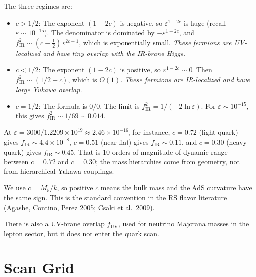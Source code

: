 \documentclass[11pt]{article}
\begin{document}
The three regimes are:
\begin{itemize}
  \item $c > 1/2$: The exponent $(1-2c)$ is negative, so
    $\varepsilon^{1-2c}$ is huge (recall $\varepsilon\sim10^{-15}$).  The
    denominator is dominated by $-\varepsilon^{1-2c}$, and
    $f_{\mathrm{IR}}^2 \sim (c-\tfrac{1}{2})\,\varepsilon^{2c-1}$, which is
    exponentially small.
    \emph{These fermions are UV-localized and have tiny overlap with the
    IR-brane Higgs.}

  \item $c < 1/2$: The exponent $(1-2c)$ is positive, so
    $\varepsilon^{1-2c}\sim 0$.  Then $f_{\mathrm{IR}}^2 \sim (1/2-c)$,
    which is $O(1)$.
    \emph{These fermions are IR-localized and have large Yukawa overlap.}

  \item $c = 1/2$: The formula is $0/0$.  The limit is
    $f_{\mathrm{IR}}^2 = 1/(-2\ln\varepsilon)$.
    For $\varepsilon\sim10^{-15}$, this gives
    $f_{\mathrm{IR}}^2 \sim 1/69 \sim 0.014$.
\end{itemize}

At $\varepsilon = 3000/1.2209\times10^{19} \approx 2.46\times10^{-16}$, for
instance, $c = 0.72$ (light quark) gives $f_{\mathrm{IR}} \sim 4.4\times10^{-8}$,
$c = 0.51$ (near flat) gives $f_{\mathrm{IR}} \sim 0.11$, and $c = 0.30$
(heavy quark) gives $f_{\mathrm{IR}} \sim 0.45$. That is 10 orders of magnitude
of dynamic range between $c = 0.72$ and $c = 0.30$; the mass hierarchies come
from geometry, not from hierarchical Yukawa couplings.

We use $c = M_5/k$, so positive $c$ means the bulk mass
and the AdS curvature have the same sign. This is the standard convention in the
RS flavor literature (Agashe, Contino, Perez 2005; Csaki et al.\ 2009).

There is also a UV-brane overlap $f_{\mathrm{UV}}$, used for neutrino Majorana
masses in the lepton sector, but it does not enter the quark scan.

\section{Scan Grid}
\label{sec:step2}
\end{document}
